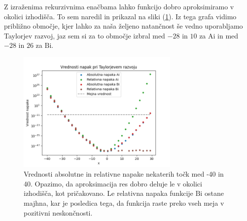 \documentclass[12pt]{article}
\newcommand{\Ai}{\mathrm{Ai}}
\newcommand{\Bi}{\mathrm{Bi}}
\begin{document}
Z izraženima rekurzivnima enačbama lahko funkcijo dobro aproksimiramo v okolici izhodišča. To sem naredil in prikazal na sliki (\ref{fig:NapakeTaylor}). Iz tega grafa vidimo približno območje, kjer lahko za naša željeno natančnost še vedno uporabljamo Taylorjev razvoj, jaz sem si za to območje izbral med $\num{-28}$ in $\num{10}$ za $\Ai$ in med $\num{-28}$ in $\num{26}$ za $\Bi$.

\begin{figure}
    \centering
    \includegraphics[width=0.7\textwidth]{NapakeTaylor.png}
    \caption{\label{fig:NapakeTaylor} Vrednosti absolutne in relativne napake nekaterih točk med -40 in 40. Opazimo, da aproksimacija res dobro deluje le v okolici izhodišča, kot pričakovano. Le relativna napaka funkcije $\Bi$ ostane majhna, kar je posledica tega, da funkcija raste preko vseh meja v pozitivni neskončnosti.}
\end{figure}

\newpage
\end{document}
